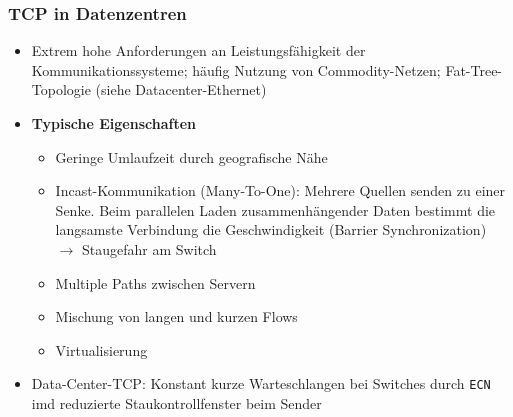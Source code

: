 \subsubsection{TCP in Datenzentren}
\begin{itemize}
	\item Extrem hohe Anforderungen an Leistungsfähigkeit der Kommunikationssysteme; häufig Nutzung von Commodity-Netzen; Fat-Tree-Topologie (siehe Datacenter-Ethernet)
	\item \textbf{Typische Eigenschaften}
	\begin{itemize}
		\item Geringe Umlaufzeit durch geografische Nähe
		\item Incast-Kommunikation (Many-To-One): Mehrere Quellen senden zu einer Senke. Beim parallelen Laden zusammenhängender Daten bestimmt die langsamste Verbindung die Geschwindigkeit (Barrier Synchronization) \(\rightarrow\) Staugefahr am Switch
		\item Multiple Paths zwischen Servern
		\item Mischung von langen und kurzen Flows
		\item Virtualisierung
	\end{itemize}
	\item Data-Center-TCP: Konstant kurze Warteschlangen bei Switches durch \texttt{ECN} imd reduzierte Staukontrollfenster beim Sender
\end{itemize}

